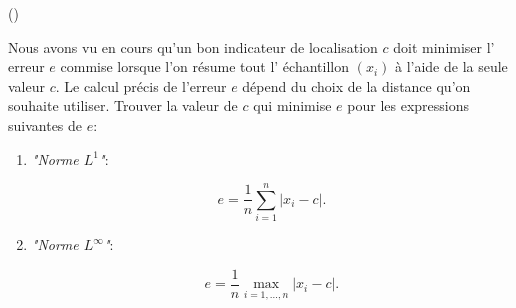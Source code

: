 \begin{exercice}\label{exo1-5} (\mortelexo)

Nous avons vu en cours qu'un bon indicateur de localisation $c$ doit minimiser l' erreur
$e$ commise lorsque l'on r\'esume tout l' \'echantillon $(x_i)$ \`a l'aide de la seule valeur $c$.
Le calcul pr\'ecis de l'erreur $e$ d\'epend du choix de la distance qu'on souhaite utiliser.
Trouver la valeur de $c$ qui minimise $e$ pour les expressions suivantes de $e$:
\begin{enumerate}

\item {\it "Norme $L^1$"}:

\[ 
e = \frac1n \sum_{i=1}^n | x_i - c |.
\]

\item {\it "Norme $L^\infty$"}:

\[ 
e = \frac1n \max_{i=1,\ldots,n} | x_i - c |.
\]

\end{enumerate}


\end{exercice}
